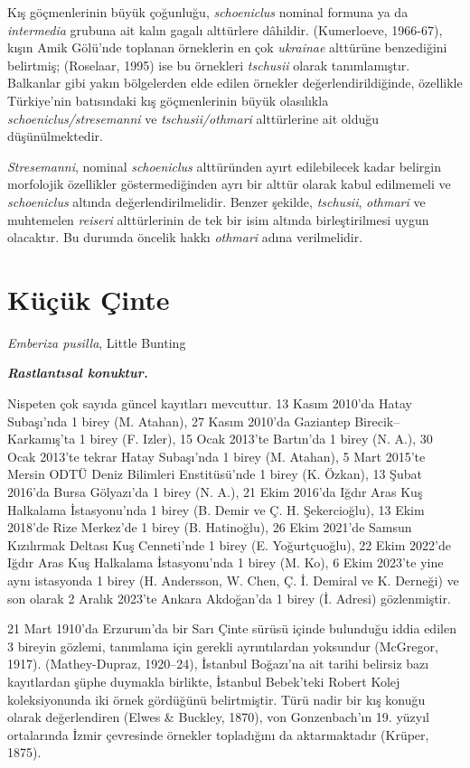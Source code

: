 \documentclass[
  10.5pt,
  a4paper,
  DIV=11,
  numbers=noendperiod,
  twocolumn]{scrreprt}
\begin{document}
Kış göçmenlerinin büyük çoğunluğu, \emph{schoeniclus} nominal formuna ya
da \emph{intermedia} grubuna ait kalın gagalı alttürlere dâhildir.
(Kumerloeve, 1966-67), kışın Amik Gölü'nde toplanan örneklerin en çok
\emph{ukrainae} alttürüne benzediğini belirtmiş; (Roselaar, 1995) ise bu
örnekleri \emph{tschusii} olarak tanımlamıştır. Balkanlar gibi yakın
bölgelerden elde edilen örnekler değerlendirildiğinde, özellikle
Türkiye'nin batısındaki kış göçmenlerinin büyük olasılıkla
\emph{schoeniclus/stresemanni} ve \emph{tschusii/othmari} alttürlerine
ait olduğu düşünülmektedir.

\emph{Stresemanni}, nominal \emph{schoeniclus} alttüründen ayırt
edilebilecek kadar belirgin morfolojik özellikler göstermediğinden ayrı
bir alttür olarak kabul edilmemeli ve \emph{schoeniclus} altında
değerlendirilmelidir. Benzer şekilde, \emph{tschusii}, \emph{othmari} ve
muhtemelen \emph{reiseri} alttürlerinin de tek bir isim altında
birleştirilmesi uygun olacaktır. Bu durumda öncelik hakkı \emph{othmari}
adına verilmelidir.

\section{Küçük Çinte}\label{kuxfcuxe7uxfck-uxe7inte}

\emph{Emberiza pusilla}, Little Bunting

\textbf{\emph{Rastlantısal konuktur.}}

Nispeten çok sayıda güncel kayıtları mevcuttur. 13 Kasım 2010'da Hatay
Subaşı'nda 1 birey (M. Atahan), 27 Kasım 2010'da Gaziantep
Birecik--Karkamış'ta 1 birey (F. Izler), 15 Ocak 2013'te Bartın'da 1
birey (N. A.), 30 Ocak 2013'te tekrar Hatay Subaşı'nda 1 birey (M.
Atahan), 5 Mart 2015'te Mersin ODTÜ Deniz Bilimleri Enstitüsü'nde 1
birey (K. Özkan), 13 Şubat 2016'da Bursa Gölyazı'da 1 birey (N. A.), 21
Ekim 2016'da Iğdır Aras Kuş Halkalama İstasyonu'nda 1 birey (B. Demir ve
Ç. H. Şekercioğlu), 13 Ekim 2018'de Rize Merkez'de 1 birey (B.
Hatinoğlu), 26 Ekim 2021'de Samsun Kızılırmak Deltası Kuş Cenneti'nde 1
birey (E. Yoğurtçuoğlu), 22 Ekim 2022'de Iğdır Aras Kuş Halkalama
İstasyonu'nda 1 birey (M. Ko), 6 Ekim 2023'te yine aynı istasyonda 1
birey (H. Andersson, W. Chen, Ç. İ. Demiral ve K. Derneği) ve son olarak
2 Aralık 2023'te Ankara Akdoğan'da 1 birey (İ. Adresi) gözlenmiştir.

21 Mart 1910'da Erzurum'da bir Sarı Çinte sürüsü içinde bulunduğu iddia
edilen 3 bireyin gözlemi, tanımlama için gerekli ayrıntılardan yoksundur
(McGregor, 1917). (Mathey-Dupraz, 1920--24), İstanbul Boğazı'na ait
tarihi belirsiz bazı kayıtlardan şüphe duymakla birlikte, İstanbul
Bebek'teki Robert Kolej koleksiyonunda iki örnek gördüğünü belirtmiştir.
Türü nadir bir kış konuğu olarak değerlendiren (Elwes \& Buckley, 1870),
von Gonzenbach'ın 19. yüzyıl ortalarında İzmir çevresinde örnekler
topladığını da aktarmaktadır (Krüper, 1875).
\end{document}
